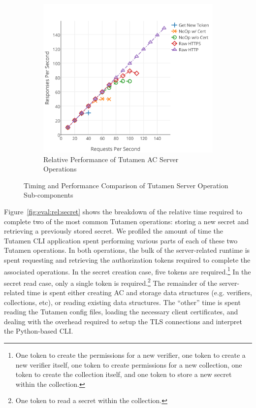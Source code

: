 \begin{figure}[th]
\begin{subfigure}[t]{0.48\textwidth}
    \includegraphics[width=\textwidth]{./figs/png/get_ac_auth_breakdown_chart.png}
    \caption{Relative Performance of Tutamen AC Server Operations}
    \label{fig:eval:rel:acops}
  \end{subfigure}
  \caption{Timing and Performance Comparison of Tutamen Server
    Operation Sub-components}
  \label{fig:eval:rel}
\end{figure}

Figure~\ref{fig:eval:rel:secret} shows the breakdown of the relative
time required to complete two of the most common Tutamen operations:
storing a new secret and retrieving a previously stored secret. We
profiled the amount of time the Tutamen CLI application spent
performing various parts of each of these two Tutamen operations. In
both operations, the bulk of the server-related runtime is spent
requesting and retrieving the authorization tokens required to
complete the associated operations. In the secret creation case, five
tokens are required.\footnote{One token to create the permissions for
  a new verifier, one token to create a new verifier itself, one token
  to create permissions for a new collection, one token to create the
  collection itself, and one token to store a new secret within the
  collection.} In the secret read case, only a single token is
required.\footnote{One token to read a secret within the collection.}
The remainder of the server-related time is spent either creating AC
and storage data structures (e.g. verifiers, collections, etc), or
reading existing data structures. The ``other'' time is spent reading
the Tutamen config files, loading the necessary client certificates,
and dealing with the overhead required to setup the TLS connections
and interpret the Python-based CLI.


